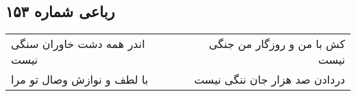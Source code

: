 \begin{center}
\section*{رباعی شماره ۱۵۳}
\label{sec:sh153}
\begin{longtable}{l p{0.5cm} r}
اندر همه دشت خاوران سنگی نیست
&&
کش با من و روزگار من جنگی نیست
\\
با لطف و نوازش وصال تو مرا
&&
دردادن صد هزار جان ننگی نیست
\\
\end{longtable}
\end{center}
